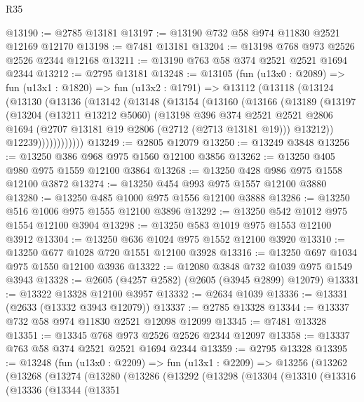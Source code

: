 \begin{lexlean}{R35}
\begin{coremodule}
@13190 := @2785 @13181
@13197 := @13190 @732 @58 @974 @11830 @2521 @12169 @12170
@13198 := @7481 @13181
@13204 := @13198 @768 @973 @2526 @2526 @2344 @12168
@13211 := @13190 @763 @58 @374 @2521 @2521 @1694 @2344
@13212 := @2795 @13181
@13248 := @13105
    (fun (u13x0 : @2089) =>
    fun (u13x1 : @1820) =>
    fun (u13x2 : @1791) =>
    @13112
      (@13118
        (@13124
          (@13130
            (@13136
              (@13142
                (@13148
                  (@13154
                    (@13160
                      (@13166
                        (@13189
                          (@13197
                            (@13204
                              (@13211 @13212 @5060)
                              (@13198
                                @396
                                @374
                                @2521
                                @2521
                                @2806
                                @1694
                                (@2707 @13181 @19 @2806 (@2712 (@2713 @13181 @19)))
                                @13212))
                            @12239))))))))))))
@13249 := @2805 @12079
@13250 := @13249 @3848
@13256 := @13250 @386 @968 @975 @1560 @12100 @3856
@13262 := @13250 @405 @980 @975 @1559 @12100 @3864
@13268 := @13250 @428 @986 @975 @1558 @12100 @3872
@13274 := @13250 @454 @993 @975 @1557 @12100 @3880
@13280 := @13250 @485 @1000 @975 @1556 @12100 @3888
@13286 := @13250 @516 @1006 @975 @1555 @12100 @3896
@13292 := @13250 @542 @1012 @975 @1554 @12100 @3904
@13298 := @13250 @583 @1019 @975 @1553 @12100 @3912
@13304 := @13250 @636 @1024 @975 @1552 @12100 @3920
@13310 := @13250 @677 @1028 @720 @1551 @12100 @3928
@13316 := @13250 @697 @1034 @975 @1550 @12100 @3936
@13322 := @12080 @3848 @732 @1039 @975 @1549 @3943
@13328 := @2605 (@4257 @2582) (@2605 (@3945 @2899) @12079)
@13331 := @13322 @13328 @12100 @3957
@13332 := @2634 @1039
@13336 := @13331 (@2633 (@13332 @3943 @12079))
@13337 := @2785 @13328
@13344 := @13337 @732 @58 @974 @11830 @2521 @12098 @12099
@13345 := @7481 @13328
@13351 := @13345 @768 @973 @2526 @2526 @2344 @12097
@13358 := @13337 @763 @58 @374 @2521 @2521 @1694 @2344
@13359 := @2795 @13328
@13395 := @13248
    (fun (u13x0 : @2209) =>
    fun (u13x1 : @2209) =>
    @13256
      (@13262
        (@13268
          (@13274
            (@13280
              (@13286
                (@13292
                  (@13298
                    (@13304
                      (@13310
                        (@13316
                          (@13336
                            (@13344
                              (@13351

\end{coremodule}
\end{lexlean}
